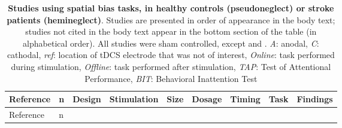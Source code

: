 \documentclass[11pt,]{memoir}
\begin{document}
\begin{longtable}[]{@{}lllllllll@{}}
\caption{\label{tab:spatial-bias} \textbf{Studies using spatial bias tasks, in healthy controls (pseudoneglect) or stroke patients (hemineglect)}. Studies are presented in order of appearance in the body text; studies not cited in the body text appear in the bottom section of the table (in alphabetical order). All studies were sham controlled, except \textcite{Turgut2016} and \textcite{Bang2015}. \emph{A}: anodal, \emph{C}: cathodal, \emph{ref}: location of tDCS electrode that was not of interest, \emph{Online}: task performed during stimulation, \emph{Offline}: task performed after stimulation, \emph{TAP}: Test of Attentional Performance, \emph{BIT}: Behavioral Inattention Test}\tabularnewline
\toprule
\begin{minipage}[b]{0.09\columnwidth}\raggedright
Reference\strut
\end{minipage} & \begin{minipage}[b]{0.02\columnwidth}\raggedright
n\strut
\end{minipage} & \begin{minipage}[b]{0.04\columnwidth}\raggedright
Design\strut
\end{minipage} & \begin{minipage}[b]{0.10\columnwidth}\raggedright
Stimulation\strut
\end{minipage} & \begin{minipage}[b]{0.04\columnwidth}\raggedright
Size\strut
\end{minipage} & \begin{minipage}[b]{0.04\columnwidth}\raggedright
Dosage\strut
\end{minipage} & \begin{minipage}[b]{0.04\columnwidth}\raggedright
Timing\strut
\end{minipage} & \begin{minipage}[b]{0.10\columnwidth}\raggedright
Task\strut
\end{minipage} & \begin{minipage}[b]{0.28\columnwidth}\raggedright
Findings\strut
\end{minipage}\tabularnewline
\midrule
\endfirsthead
\toprule
\begin{minipage}[b]{0.09\columnwidth}\raggedright
Reference\strut
\end{minipage} & \begin{minipage}[b]{0.02\columnwidth}\raggedright
n\strut
\end{minipage} & \begin{minipage}[b]{0.04\columnwidth}\raggedright

\end{minipage}
\end{longtable}
\end{document}

